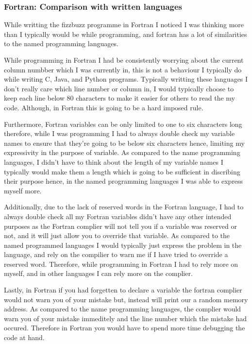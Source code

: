 \documentclass[
	12pt, %
]{fphw}
\begin{document}
\subsubsection{Fortran: Comparison with written languages}

While writting the fizzbuzz programme in Fortran I noticed I was thinking more than I typically would be
while programming, and fortran has a lot of similarities to the named programming
languages. \par

While programming in Fortran I had be consistently worrying about the current
column numbber which I was currently in, this is not a behaviour I typically
do while writing C, Java, and Python programs. Typically writting these languages
I don't really care which line number or column in, I would typically choose to
keep each line below 80 characters to make it easier for others to read the my code.
Although, in Fortran this is going to be a hard imposed rule. \par

Furthermore, Fortran variables can be only limited to one to six characters long
therefore, while I was programming I had to always double check my variable names
to ensure that they're going to be below six characters hence, limiting my expressivity
in the purpose of variable. As compared to the name programming languages, I didn't
have to think about the length of my variable names I typically would make them
a length which is going to be sufficient in discribing their purpose hence, in the
named programming languages I was able to express myself more. \par


Additionally, due to the lack of reserved words in the Fortran language, I had  to
always double check all my Fortran variables didn't have any other intended
purposes as the Fortran complier will not tell you if a variable was reserved or
not, and it will just allow you to override that variable. As compared to the named
programmed languages I would typically just express the problem in the language,
and rely on the compilier to warn me if I have tried to override a reserved word.
Therefore, while programming in Fortran I had to rely more on myself, and in other
languages I can rely more on the complier.\par

Lastly, in Fortran if you had forgetten to declare a variable the fortran
complier would not warn you of your mistake but, instead will print our a random
memory address. As compared to the name programming languages, the complier
would warn you of your mistake immeditely and the line number which the mistake
had occured. Therefore in Fortran you would have to spend more time debugging
the code at hand.\par
\end{document}
